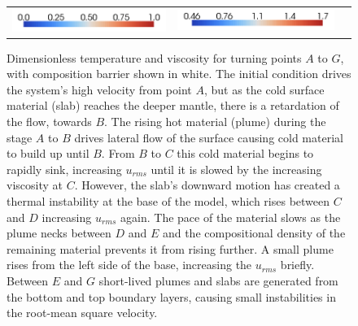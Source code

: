 \begin{figure}[htbp]
\begin{center}
\begin{tabular}{c c l}
\includegraphics[width=0.45\columnwidth]{chapters/vynnytska/figures/tmleg.png} &
\includegraphics[width=0.45\columnwidth]{chapters/vynnytska/figures/visleg.png} &
\end{tabular}
\end{center}
\label{vynnytska:fig:BG}
\caption{Dimensionless temperature and viscosity for turning points
  $A$ to $G$, with composition barrier shown in white. The initial
  condition drives the system's high velocity from point $A$, but as
  the cold surface material (slab) reaches the deeper mantle, there is
  a retardation of the flow, towards $B$. The rising hot material
  (plume) during the stage $A$ to $B$ drives lateral flow of the
  surface causing cold material to build up until $B$. From $B$ to $C$
  this cold material begins to rapidly sink, increasing $u_{rms}$
  until it is slowed by the increasing viscosity at $C$. However, the
  slab's downward motion has created a thermal instability at the base
  of the model, which rises between $C$ and $D$ increasing $u_{rms}$
  again. The pace of the material slows as the plume necks between $D$
  and $E$ and the compositional density of the remaining material
  prevents it from rising further. A small plume rises from the left
  side of the base, increasing the $u_{rms}$ briefly. Between $E$ and
  $G$ short-lived plumes and slabs are generated from the bottom and
  top boundary layers, causing small instabilities in the root-mean
  square velocity.}
\end{figure}
